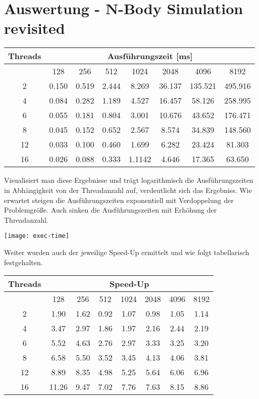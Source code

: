 \documentclass{article}
\newcommand{\enterProblemHeader}[1]{
}
\newcommand{\exitProblemHeader}[1]{
}
\newcounter{homeworkProblemCounter} %
\newcommand{\homeworkProblemName}{}
\newenvironment{homeworkProblem}[1][Problem \arabic{homeworkProblemCounter}]{ %
\stepcounter{homeworkProblemCounter} %
\renewcommand{\homeworkProblemName}{#1} %
\section{\homeworkProblemName} %
}{
}
\begin{document}
\begin{homeworkProblem}[Auswertung - N-Body Simulation revisited]
\begin{center}
\begin{tabular}{|c|c|c|c|c|c|c|c|}\hline
   Threads & \multicolumn{7}{c|}{Ausführungszeit [ms]} \\ \hline
      & 128   & 256   & 512   & 1024 & 2048 & 4096 & 8192 \\ \hline
    2 & 0.150 & 0.519 & 2.444 & 8.269 & 36.137 & 135.521 & 495.916 \\ \hline
    4 & 0.084 & 0.282 & 1.189 & 4.527 & 16.457 & 58.126 & 258.995 \\ \hline
    6 & 0.055 & 0.181 & 0.804 & 3.001 & 10.676 & 43.652 & 176.471 \\ \hline
    8 & 0.045 & 0.152 & 0.652 & 2.567 & 8.574 & 34.839 & 148.560 \\ \hline
    12 & 0.033 & 0.100 & 0.460 & 1.699 & 6.282 & 23.424 & 81.303 \\ \hline
    16 & 0.026 & 0.088 & 0.333 & 1.1142 & 4.646 & 17.365 & 63.650 \\ \hline
 \end{tabular}
\end{center}
Visualisiert man diese Ergebnisse und trägt logarithmisch die Ausführungszeiten in 
Abhängigkeit von der Threadanzahl auf, verdeutlicht sich das Ergebniss. Wie erwartet
steigen die Ausführungszeiten exponentiell mit Verdoppelung der Problemgröße. Auch
sinken die Ausführungszeiten mit Erhöhung der Threadanzahl.
\begin{center}
\texttt{[image: exec-time]}
\end{center}
Weiter wurden auch der jeweilige Speed-Up ermittelt und wie folgt tabellarisch
festgehalten.
\begin{center}
\begin{tabular}{|c|c|c|c|c|c|c|c|}\hline
   Threads & \multicolumn{7}{c|}{Speed-Up} \\ \hline
      & 128   & 256   & 512   & 1024 & 2048 & 4096 & 8192 \\ \hline
    2 & 1.90 & 1.62 & 0.92 & 1.07 & 0.98 & 1.05 & 1.14 \\ \hline
    4 & 3.47 & 2.97 & 1.86 & 1.97 & 2.16 & 2.44 & 2.19 \\ \hline
    6 & 5.52 & 4.63 & 2.76 & 2.97 & 3.33 & 3.25 & 3.20 \\ \hline
    8 & 6.58 & 5.50 & 3.52 & 3.45 & 4.13 & 4.06 & 3.81 \\ \hline
    12 & 8.89 & 8.35 & 4.98 & 5.25 & 5.64 & 6.06 & 6.96 \\ \hline
    16 & 11.26 & 9.47 & 7.02 & 7.76 & 7.63 & 8.15 & 8.86 \\ \hline

\end{tabular}
\end{center}
\end{homeworkProblem}
\end{document}
